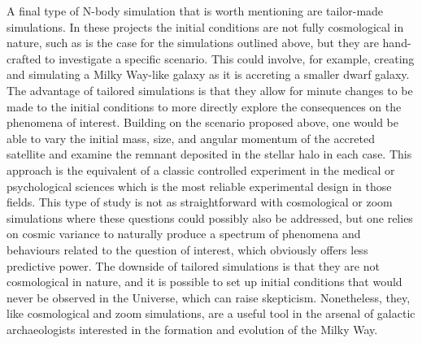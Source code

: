 A final type of N-body simulation that is worth mentioning are tailor-made simulations. In these projects the initial conditions are not fully cosmological in nature, such as is the case for the simulations outlined above, but they are hand-crafted to investigate a specific scenario. This could involve, for example, creating and simulating a Milky Way-like galaxy as it is accreting a smaller dwarf galaxy. The advantage of tailored simulations is that they allow for minute changes to be made to the initial conditions to more directly explore the consequences on the phenomena of interest. Building on the scenario proposed above, one would be able to vary the initial mass, size, and angular momentum of the accreted satellite and examine the remnant deposited in the stellar halo in each case. This approach is the equivalent of a classic controlled experiment in the medical or psychological sciences which is the most reliable experimental design in those fields. This type of study is not as straightforward with cosmological or zoom simulations where these questions could possibly also be addressed, but one relies on cosmic variance to naturally produce a spectrum of phenomena and behaviours related to the question of interest, which obviously offers less predictive power. The downside of tailored simulations is that they are not cosmological in nature, and it is possible to set up initial conditions that would never be observed in the Universe, which can raise skepticism. Nonetheless, they, like cosmological and zoom simulations, are a useful tool in the arsenal of galactic archaeologists interested in the formation and evolution of the Milky Way.